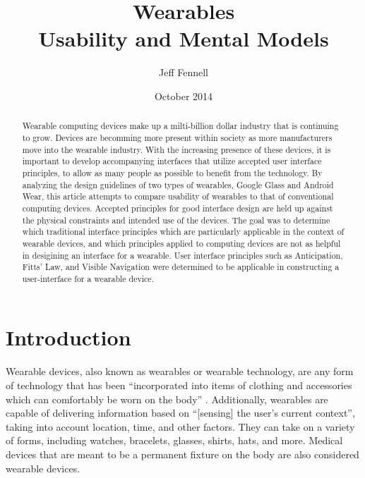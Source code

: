 \documentclass[12pt]{article}
\begin{document}
\begin{abstract}
Wearable computing devices make up a milti-billion dollar industry that is continuing to grow. Devices are becomming more present within society as more manufacturers move into the wearable industry. With the increasing presence of these devices, it is important to develop accompanying interfaces that utilize accepted user interface principles, to allow as many people as possible to benefit from the technology. By analyzing the design guidelines of two types of wearables, Google Glass and Android Wear, this article attempts to compare usability of wearables to that of conventional computing devices. Accepted principles for good interface design are held up against the physical constraints and intended use of the devices. The goal was to determine which traditional interface principles which are particularly applicable in the context of wearable devices, and which principles applied to computing devices are not as helpful in desigining an interface for a wearable. User interface principles such as Anticipation, Fitts' Law, and Visible Navigation were determined to be applicable in constructing a user-interface for a wearable device.

\end{abstract}

\title{Wearables \\ \vspace{2 mm} {\large Usability and Mental Models}}
\author{Jeff Fennell}
\date{October 2014}
\maketitle

\tableofcontents

\section{Introduction}
Wearable devices, also known as wearables or wearable technology, are any form of technology that has been ``incorporated into items of clothing and accessories which can comfortably be worn on the body'' \cite{wd}. Additionally, wearables are capable of delivering information based on ``[sensing] the user's current context'', taking into account location, time, and other factors\cite{star}. They can take on a variety of forms, including watches, bracelets, glasses, shirts, hats, and more. Medical devices that are meant to be a permanent fixture on the body are also considered wearable devices.
\end{document}
